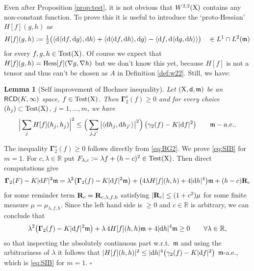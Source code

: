 \documentclass[11pt]{article}
\numberwithin{equation}{section}
\newtheorem{lemma}[theorem]{Lemma}
\newenvironment{idea}{\removelastskip\par\medskip   %
\noindent{\em Idea of the proof} \rm}{\penalty-20\null\hfill$\square$\par\medbreak}
\newcommand{\R}{\mathbb{R}}
\newcommand{\X}{{\rm X}}
\newcommand{\sfd}{{\sf d}}
\newcommand{\mm}{{\mathfrak m}}
\newcommand{\RCD}{{\sf RCD}}
\renewcommand{\d}{{\rm d}}
\newcommand\la{\langle}
\newcommand\ra{\rangle}
\newcommand{\test}{{\rm Test}}
\newcommand{\Ggamma}{{\mathbf \Gamma}}
\begin{document}
Even after Proposition \ref{prop:test}, it is not obvious that $W^{2,2}(\X)$ contains any non-constant function. To prove this it is useful to introduce  the `proto-Hessian' $H[f](g,h)$ as%
\[
H[f](g,h):=\tfrac12\big(\la\d\la\d f,\d g\ra,\d h\ra+\la\d \la\d f,\d h\ra,\d g\ra-\la\d f,\d\la\d g,\d h\ra\ra\big)\quad\in L^1\cap L^2(\mm) 
\]
for every $f,g,h\in\test(\X)$. Of course we expect that $H[f](g,h)={\rm Hess}[f](\nabla g,\nabla h)$ but we don't know this yet, because $H[f]$ is not a tensor and thus can't be chosen as $A$ in Definition \ref{def:w22}. Still, we have:
\begin{lemma}[Self improvement of  Bochner inequality]\label{le:sibo} Let $(\X,\sfd,\mm)$ be an $\RCD(K,\infty)$ space, $f\in\test(\X)$. Then $\Ggamma_2^s(f)\geq0$ and for every  choice $(h_j)\subset\test(\X)$, $j=1,\ldots,m$, we have
\begin{equation}
\label{eq:SIB}
\Big|\sum_jH[f](h_j,h_j)\Big|^2\leq  \Big(\sum_{j,j'}\big|\la\d h_j, \d h_{j'}\ra\big|^2\Big)\,\big(\gamma_2(f)-K|\d f|^2\big)\qquad\mm-a.e..
\end{equation}
\end{lemma}
\begin{idea}\footnotemark The inequality $\Ggamma_2^s(f)\geq0$  follows directly from \eqref{eq:BG2}. We prove \eqref{eq:SIB} for $m=1$. For $c,\lambda\in\R$ put $F_{\lambda,c}:=\lambda f+(h-c)^2\in\test(\X)$. Then direct computations give
\[
\Ggamma_2(F)-K|\d F|^2\mm=\lambda^2\big(\Ggamma_2(f)-K|\d f|^2\mm\big)+\big(4\lambda H[f](h,h)+4|\d h|^4\big)\mm+(h-c){\bf R}_{c}
\]
for some reminder term ${\bf R}_{c}={\bf R}_{c,\lambda,f,h}$ satisfying $|{\bf R}_{c}|\leq(1+c^2)\mu$ for some finite measure $\mu=\mu_{\lambda,f,h}$. Since the left hand side is $\geq0$ and $c\in\R$ is arbitrary, we can conclude that 
\[
\lambda^2\big(\Ggamma_2(f)-K|\d  f|^2\mm\big)+\lambda\,4 H[f](h,h)\mm+4|\d h|^4\mm\geq0\qquad \forall\lambda\in\R,
\]
so that inspecting the absolutely continuous part w.r.t.\ $\mm$ and using the arbitrariness of $\lambda$ it   follows that  $|H[f](h,h)|^2\leq |\d  h|^4\big(\gamma_2(f)-K|\d f|^2\big)$ $\mm$-a.e., which is \eqref{eq:SIB} for $m=1$. 
%
\end{idea}
\end{document}
